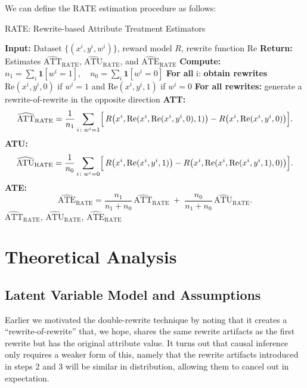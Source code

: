 We can define the RATE estimation procedure as follows:
\begin{algorithm}[H]
  \caption{RATE: Rewrite-based Attribute Treatment Estimators}
  \label{alg:rate}
  \begin{algorithmic}[1]
  \State \textbf{Input:} Dataset $\{(x^i, y^{i}, w^{i})\}$, reward model $R$, rewrite function $\text{Re}$
  \State \textbf{Return:} Estimates $\widehat{\text{ATT}}_{\text{RATE}}$, $\widehat{\text{ATU}}_{\text{RATE}}$, and $\widehat{\text{ATE}}_{\text{RATE}}$
  \State \textbf{Compute:} $n_1 = \sum_{i} \mathbf{1}[w^{i}=1], \quad n_0 = \sum_{i} \mathbf{1}[w^{i}=0]$
  \State \textbf{For all }i: \textbf{obtain rewrites} $\text{Re}(x^i, y^{i}, 0)$ if $w^{i} = 1$ and $\text{Re}(x^i, y^{i}, 1)$ if $w^{i} = 0$
  \State \textbf{For all rewrites:} generate a rewrite-of-rewrite in the opposite direction
  \State \textbf{ATT:}
  \[
    \widehat{\text{ATT}}_{\text{RATE}} = \frac{1}{n_1} \sum_{i\colon w^{i}=1} \Bigl[\,R\bigl(x^i, \text{Re}(x^i, \text{Re}(x^i, y^{i},0),1)\bigr) - R\bigl(x^i,\text{Re}(x^i, y^{i},0)\bigr)\Bigr].
  \]
  \State \textbf{ATU:}
  \[
    \widehat{\text{ATU}}_{\text{RATE}} = \frac{1}{n_0} \sum_{i\colon w^{i}=0} \Bigl[\,R\bigl(x^i, \text{Re}(x^i, y^{i},1)\bigr) - R\bigl(x^i,\text{Re}(x^i, \text{Re}(x^i, y^{i},1),0)\bigr)\Bigr].
  \]
  \State \textbf{ATE: }
  \[
    \widehat{\text{ATE}}_{\text{RATE}} =
    \frac{n_1}{n_1+n_0}\,\widehat{\text{ATT}}_{\text{RATE}}
    \;+\;
    \frac{n_0}{n_1+n_0}\,\widehat{\text{ATU}}_{\text{RATE}}.
  \]
  \State \Return $\widehat{\text{ATT}}_{\text{RATE}}, \,\widehat{\text{ATU}}_{\text{RATE}}, \,\widehat{\text{ATE}}_{\text{RATE}}$
  \end{algorithmic}
\end{algorithm}

\section{Theoretical Analysis}
\label{sec:theory}

\subsection{Latent Variable Model and Assumptions}
Earlier we motivated the double-rewrite technique by noting that it creates a ``rewrite-of-rewrite'' that, we hope, shares the same rewrite artifacts as the first rewrite but has the original attribute value. It turns out that causal inference only requires a weaker form of this, namely that the rewrite artifacts introduced in steps 2 and 3 will be similar in distribution, allowing them to cancel out in expectation.

